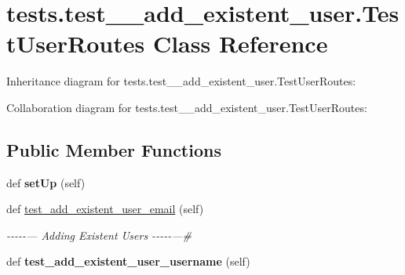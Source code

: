 \hypertarget{classtests_1_1test__2__add__existent__user_1_1_test_user_routes}{}\section{tests.\+test\+\_\+\_\+add\+\_\+existent\+\_\+user.\+Test\+User\+Routes Class Reference}
\label{classtests_1_1test__2__add__existent__user_1_1_test_user_routes}


Inheritance diagram for tests.\+test\+\_\+\_\+add\+\_\+existent\+\_\+user.\+Test\+User\+Routes\+:


Collaboration diagram for tests.\+test\+\_\+\_\+add\+\_\+existent\+\_\+user.\+Test\+User\+Routes\+:
\subsection*{Public Member Functions}
\begin{DoxyCompactItemize}
\item 
\mbox{\label{classtests_1_1test__2__add__existent__user_1_1_test_user_routes_a25c1a87e5087a939d9b2e515df71a387}} 
def {\bfseries set\+Up} (self)
\item 
\mbox{\label{classtests_1_1test__2__add__existent__user_1_1_test_user_routes_a8de1d56dc1f1146b054f51401ac37ae0}} 
def \hyperlink{classtests_1_1test__2__add__existent__user_1_1_test_user_routes_a8de1d56dc1f1146b054f51401ac37ae0}{test\+\_\+add\+\_\+existent\+\_\+user\+\_\+email} (self)
\begin{DoxyCompactList}\small\item\em -\/-\/-\/-\/-\/--- Adding Existent Users -\/-\/-\/-\/-\/---\# \end{DoxyCompactList}\item 
\mbox{\label{classtests_1_1test__2__add__existent__user_1_1_test_user_routes_ae1c1cf191182030649c30e21f8a53f42}} 
def {\bfseries test\+\_\+add\+\_\+existent\+\_\+user\+\_\+username} (self)
\end{DoxyCompactItemize}
